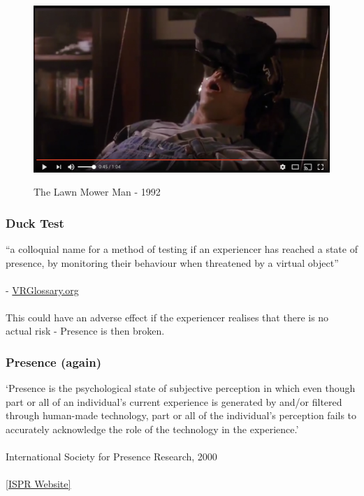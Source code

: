 \begin{frame}
	\begin{figure}
		\href{https://www.youtube.com/watch?v=gvozcv8pS3c}{ \includegraphics[scale=.3]{assets/mower}  }
		\caption{The Lawn Mower Man - 1992}
	\end{figure}
\end{frame}

\begin{frame}
	\frametitle{Duck Test}
	``a colloquial name for a method of testing if an experiencer has reached a state of presence, by monitoring their behaviour when threatened by a virtual object'' \\~\\
	- \href{http://www.vrglossary.org/glossary/duck-test/}{VRGlossary.org} \\~\\
	This could have an adverse effect if the experiencer realises that there is no actual risk - Presence is then broken.
		
\end{frame}


\begin{frame}
	\frametitle{Presence (again)}
	
	`Presence is the psychological state of subjective perception in which even though part or all of an individual's current experience is generated by and/or filtered through human-made technology, part or all of the individual's perception fails to accurately acknowledge the role of the technology in the experience.' \\~\\
	
	International Society for Presence Research, 2000
	\\~\\
	\href{http://ispr.info}{[ISPR Website]}	
	
\end{frame}


